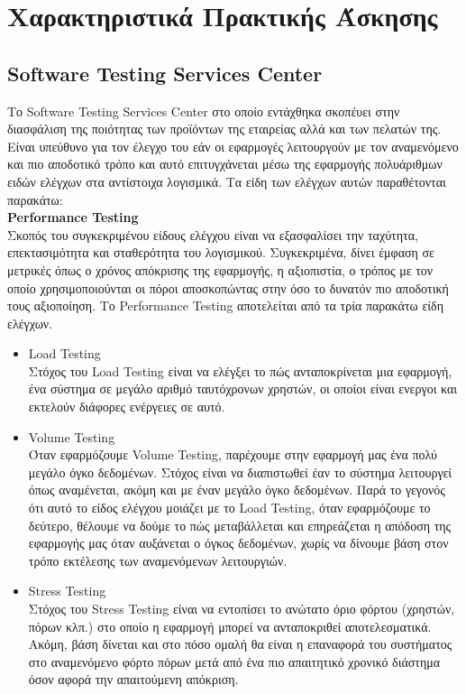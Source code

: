 \chapter*{Χαρακτηριστικά Πρακτικής Άσκησης}

\section*{\textlatin{Software Testing Services Center}}

Το \textlatin{Software Testing Services Center} στο οποίο εντάχθηκα σκοπέυει στην διασφάλιση της ποιότητας των προϊόντων της εταιρείας αλλά και των πελατών της. Είναι υπεύθυνο για τον έλεγχο του εάν οι εφαρμογές λειτουργούν με τον αναμενόμενο και πιο αποδοτικό τρόπο και αυτό επιτυγχάνεται μέσω της εφαρμογής πολυάριθμων ειδών ελέγχων στα αντίστοιχα λογισμικά. Τα είδη των ελέγχων αυτών παραθέτονται παρακάτω:\\

\textlatin{\textbf{Performance Testing}}\\
Σκοπός του συγκεκριμένου είδους ελέγχου είναι να εξασφαλίσει την ταχύτητα, επεκτασιμότητα και σταθερότητα του λογισμικού. Συγκεκριμένα, δίνει έμφαση σε μετρικές όπως ο χρόνος απόκρισης της εφαρμογής, η αξιοπιστία, ο τρόπος με τον οποίο χρησιμοποιούνται οι πόροι αποσκοπώντας στην όσο το δυνατόν πιο αποδοτική τους αξιοποίηση. Το \textlatin{Performance Testing} αποτελείται από τα τρία παρακάτω είδη ελέγχων.

\begin{itemize}
    \item \textlatin{Load Testing}\\
    Στόχος του \textlatin{Load Testing} είναι να ελέγξει το πώς ανταποκρίνεται μια εφαρμογή, ένα σύστημα σε μεγάλο αριθμό ταυτόχρονων χρηστών, οι οποίοι είναι ενεργοι και εκτελούν διάφορες ενέργειες σε αυτό.
    \item \textlatin{Volume Testing}\\
    Όταν εφαρμόζουμε \textlatin{Volume Testing}, παρέχουμε στην εφαρμογή μας ένα πολύ μεγάλο όγκο δεδομένων. Στόχος είναι να διαπιστωθεί έαν το σύστημα λειτουργεί όπως αναμένεται, ακόμη και με έναν μεγάλο όγκο δεδομένων. Παρά το γεγονός ότι αυτό το είδος ελέγχου μοιάζει με το \textlatin{Load Testing}, όταν εφαρμόζουμε το δεύτερο, θέλουμε να δούμε το πώς μεταβάλλεται και επηρεάζεται η απόδοση της εφαρμογής μας όταν αυξάνεται ο όγκος δεδομένων, χωρίς να δίνουμε βάση στον τρόπο εκτέλεσης των αναμενόμενων λειτουργιών.
    \item \textlatin{Stress Testing}\\
    Στόχος του \textlatin{Stress Testing} είναι να εντοπίσει το ανώτατο όριο φόρτου (χρηστών, πόρων κλπ.) στο οποίο η εφαρμογή μπορεί να ανταποκριθεί αποτελεσματικά. Ακόμη, βάση δίνεται και στο πόσο ομαλή θα είναι η επαναφορά του συστήματος στο αναμενόμενο φόρτο πόρων μετά από ένα πιο απαιτητικό χρονικό διάστημα όσον αφορά την απαιτούμενη απόκριση. \\
\end{itemize}

